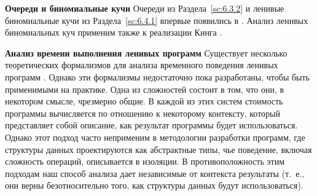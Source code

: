 \noindent
\textbf{Очереди и биномиальные кучи} Очереди из
Раздела~\ref{sc:6.3.2} и ленивые биномиальные кучи из
Раздела~\ref{sc:6.4.1} впервые появились в \cite{Okasaki1996b}. Анализ
ленивых биномиальных куч применим также к реализации Кинга
\cite{King1994}.

\noindent
\textbf{Анализ времени выполнения ленивых программ} Существует несколько
теоретических формализмов для анализа временного поведения ленивых
программ \cite{BjernerHolmstrom1989, Sands1990, Sands1995,
  Wadler1988}. Однако эти формализмы недостаточно пока разработаны,
чтобы быть применимыми на практике. Одна из сложностей состоит в том,
что они, в некотором смысле, чрезмерно общие. В каждой из этих систем
стоимость программы вычисляется по отношению к некоторому контексту,
который представляет собой описание, как результат программы будет
использоваться. Однако этот подход часто неприменим в методологии
разработки программ, где структуры данных проектируются как
абстрактные типы, чье поведение, включая сложность операций,
описывается в изоляции. В противоположность этим подходам наш способ
анализа дает независимые от контекста результаты (т.~е., они верны
безотносительно того, как структуры данных будут использоваться).

